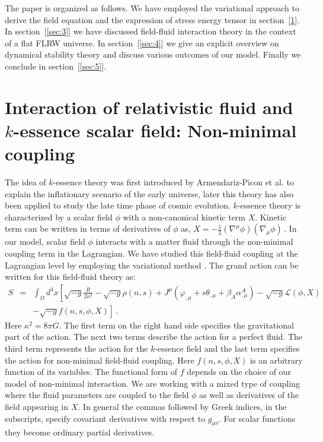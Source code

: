 \documentclass[a4paper,12pt]{article}
\newcommand{\nb}{\ensuremath{ \nabla }}
\begin{document}
The paper is organized as follows. We have employed the variational approach to derive the field equation and the expression of stress energy tensor in section~[\ref{sec:2}]. In section~[\ref{sec:3}] we have discussed field-fluid interaction theory in the context of a flat FLRW universe. In section~[\ref{sec:4}]  we give an explicit overview on dynamical stability theory and discuss various outcomes of our model.  Finally we conclude in section~[\ref{sec:5}].
\section{Interaction of relativistic fluid and $k$-essence scalar field: Non-minimal coupling}
\label{sec:2}

The idea of $k$-essence theory was first introduced by Armendariz-Picon et al. \cite{ArmendarizPicon:1999rj, ArmendarizPicon:2000ah}  to explain the inflationary scenario of the early universe, later this theory has also been applied to study the late time phase of cosmic evolution. $k$-essence theory is characterized by a scalar field $\phi$ with a non-canonical kinetic term $X$. Kinetic term can be written in terms of derivatives of $\phi$ as, $ X=-\frac12 (\nb^\mu \phi)(\nb_\mu \phi)\, $. In our model, scalar field $\phi$ interacts with a matter fluid \cite{Brown:1992kc} through the non-minimal coupling term in the Lagrangian. We have studied this field-fluid coupling at the Lagrangian level by employing the variational method \cite{Boehmer:2015kta}. The grand action can be written for this field-fluid theory as:
%
%
\begin{eqnarray}
S&=&\int_\Omega d^4x \left[\sqrt{-g}\frac{R}{2\kappa^2}-\sqrt{-g}\rho(n,s) +
J^\mu(\varphi_{,\mu} + s\theta_{,\mu} + \beta_A\alpha^A_{,\mu})    
-\sqrt{-g}{\mathcal L}(\phi,X)\right.\nonumber\\
& &\left.-\sqrt{-g}f(n,s,\phi,X)\right]\,.
\label{act}
\end{eqnarray}
Here $\kappa^2=8\pi G$. The first term on the right hand side specifies the gravitational part of the action. The next two terms describe the action for a perfect fluid. The third term represents the action for the $k$-essence field and the last term specifies the action for non-minimal field-fluid coupling. Here $f(n,s,\phi,X)$ is an arbitrary function of its variables. The functional form of $f$ depends on the choice of our model of non-minimal interaction. We are working with a  mixed type of coupling where the fluid parameters are coupled to the field $\phi$ as well as derivatives of the field appearing in $X$. In general the commas followed by Greek indices, in the subscripts, specify covariant derivatives with respect to $g_{\mu \nu}$. For scalar functions they become ordinary partial derivatives. 
\end{document}

